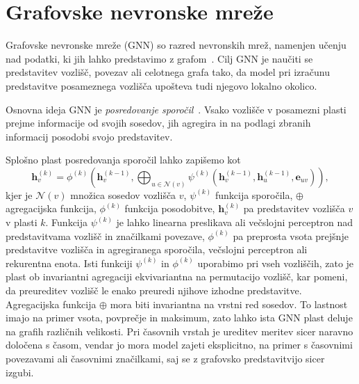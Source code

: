 \section{Grafovske nevronske mreže}
\label{subsec:gnn}

Grafovske nevronske mreže (GNN) so razred nevronskih mrež, namenjen učenju nad podatki, ki jih lahko predstavimo z grafom~\cite{gilmer2017mpnn,kipf2017gcn,velickovic2018gat}.
Cilj GNN je naučiti se predstavitev vozlišč, povezav ali celotnega grafa tako, da model pri izračunu predstavitve posameznega vozlišča upošteva tudi njegovo lokalno okolico.

Osnovna ideja GNN je \emph{posredovanje sporočil}~\cite{gilmer2017mpnn}.
Vsako vozlišče v posamezni plasti prejme informacije od svojih sosedov, jih agregira in na podlagi zbranih informacij posodobi svojo predstavitev.

Splošno plast posredovanja sporočil lahko zapišemo kot
\begin{equation}
    \mathbf{h}_v^{(k)} =
    \phi^{(k)}
    \left(
        \mathbf{h}_v^{(k-1)},
        \bigoplus_{u \in \mathcal{N}(v)}
        \psi^{(k)}
        \left(
            \mathbf{h}_v^{(k-1)},
            \mathbf{h}_u^{(k-1)},
            \mathbf{e}_{uv}
        \right)
    \right),
\end{equation}
kjer je $\mathcal{N}(v)$ množica sosedov vozlišča $v$, $\psi^{(k)}$ funkcija sporočila, $\oplus$ agregacijska funkcija, $\phi^{(k)}$ funkcija posodobitve, $\mathbf{h}_v^{(k)}$ pa predstavitev vozlišča $v$ v plasti $k$.
Funkcija $\psi^{(k)}$ je lahko linearna preslikava ali večslojni perceptron nad predstavitvama vozlišč in značilkami povezave, $\phi^{(k)}$ pa preprosta vsota prejšnje predstavitve vozlišča in agregiranega sporočila, večslojni perceptron ali rekurentna enota.
Isti funkciji $\psi^{(k)}$ in $\phi^{(k)}$ uporabimo pri vseh vozliščih, zato je plast ob invariantni agregaciji ekvivariantna na permutacijo vozlišč, kar pomeni, da preureditev vozlišč le enako preuredi njihove izhodne predstavitve.
Agregacijska funkcija $\oplus$ mora biti invariantna na vrstni red sosedov.
To lastnost imajo na primer vsota, povprečje in maksimum, zato lahko ista GNN plast deluje na grafih različnih velikosti.
Pri časovnih vrstah je ureditev meritev sicer naravno določena s časom, vendar jo mora model zajeti eksplicitno, na primer s časovnimi povezavami ali časovnimi značilkami, saj se z grafovsko predstavitvijo sicer izgubi.

